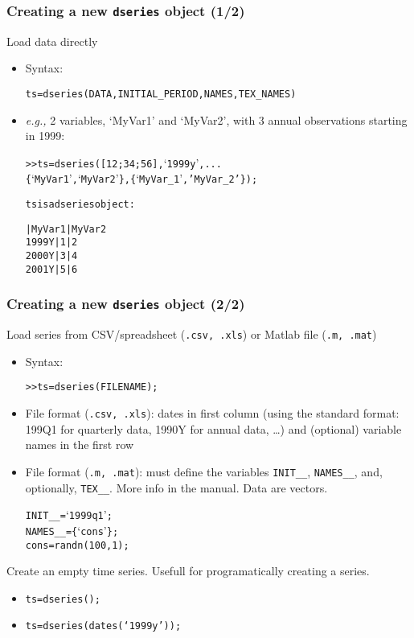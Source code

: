 \documentclass[10pt]{beamer}
\newcommand{\myitem}{\item[$\bullet$]}
\begin{document}
\begin{frame}[fragile,t]
  \frametitle{Creating a new \texttt{dseries} object (1/2)}
  Load data directly
  \begin{itemize}
    \myitem Syntax:
    \begin{alltt}
  ts = dseries(DATA, INITIAL_PERIOD, NAMES, TEX_NAMES)
    \end{alltt}
    \myitem \textit{e.g.,} 2 variables, `MyVar1' and `MyVar2', with
    3 annual observations starting in 1999:
\small{
    \begin{alltt}
  >> ts = dseries([1 2;3 4;5 6], `1999y', ...
                 \{`MyVar1', `MyVar2'\}, \{`MyVar\_1', 'MyVar\_2'\});

  ts is a dseries object:

        | MyVar1 | MyVar2
  1999Y | 1      | 2
  2000Y | 3      | 4
  2001Y | 5      | 6
    \end{alltt}}
  \end{itemize}
\end{frame}

\begin{frame}[fragile,t]
  \frametitle{Creating a new \texttt{dseries} object (2/2)}
  Load series from CSV/spreadsheet (\texttt{.csv, .xls}) or Matlab file (\texttt{.m, .mat})
  \begin{itemize}
    \myitem Syntax:
    \begin{alltt}
  >> ts = dseries(FILENAME);
    \end{alltt}
    \myitem File format (\texttt{.csv, .xls}): dates in first column (using the standard format:
    199Q1 for quarterly data, 1990Y for annual data, \dots) and (optional)
    variable names in the first row
    \myitem File format (\texttt{.m, .mat}): must define the variables \texttt{INIT\_\_},
    \texttt{NAMES\_\_}, and, optionally, \texttt{TEX\_\_}. More info in the
    manual. Data are vectors.
    \begin{alltt}
      INIT__ = `1999q1';
      NAMES__ = \{`cons'\};
      cons = randn(100,1);
    \end{alltt}
  \end{itemize}
  Create an empty time series. Usefull for programatically creating a series.
  \begin{itemize}
    \myitem \texttt{ts=dseries();}
    \myitem \texttt{ts=dseries(dates(`1999y'));}
  \end{itemize}
\end{frame}
\end{document}
